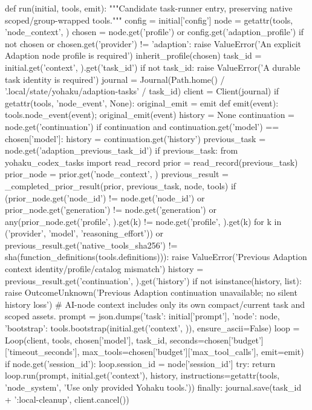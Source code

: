 {def run(initial, tools, emit):
    """Candidate task-runner entry, preserving native scoped/group-wrapped tools."""
    config = initial['config']
    node = getattr(tools, 'node_context', {})
    chosen = node.get('profile') or config.get('adaption_profile')
    if not chosen or chosen.get('provider') != 'adaption':
        raise ValueError('An explicit Adaption node profile is required')
    inherit_profile(chosen)
    task_id = initial.get('context', {}).get('task_id')
    if not task_id:
        raise ValueError('A durable task identity is required')
    journal = Journal(Path.home() / '.local/state/yohaku/adaption-tasks' / task_id)
    client = Client(journal)
    if getattr(tools, 'node_event', None):
        original_emit = emit
        def emit(event):
            tools.node_event(event); original_emit(event)
    history = None
    continuation = node.get('continuation')
    if continuation and continuation.get('model') == chosen['model']:
        history = continuation.get('history')
    previous_task = node.get('adaption_previous_task_id')
    if previous_task:
        from yohaku_codex_tasks import read_record
        prior = read_record(previous_task)
        prior_node = prior.get('node_context', {})
        previous_result = _completed_prior_result(prior, previous_task, node, tools)
        if (prior_node.get('node_id') != node.get('node_id') or
                prior_node.get('generation') != node.get('generation') or
                any(prior_node.get('profile', {}).get(k) != node.get('profile', {}).get(k)
                    for k in ('provider', 'model', 'reasoning_effort')) or
                previous_result.get('native_tools_sha256') != sha(function_definitions(tools.definitions))):
            raise ValueError('Previous Adaption context identity/profile/catalog mismatch')
        history = previous_result.get('continuation', {}).get('history')
        if not isinstance(history, list):
            raise OutcomeUnknown('Previous Adaption continuation unavailable; no silent history loss')
    # AI-node context includes only its own compact/current task and scoped assets.
    prompt = json.dumps({'task': initial['prompt'], 'node': node,
                         'bootstrap': tools.bootstrap(initial.get('context', {}))}, ensure_ascii=False)
    loop = Loop(client, tools, chosen['model'], task_id, seconds=chosen['budget']['timeout_seconds'],
                max_tools=chosen['budget']['max_tool_calls'], emit=emit)
    if node.get('session_id'):
        loop.session_id = node['session_id']
    try:
        return loop.run(prompt, initial.get('context'), history,
                        instructions=getattr(tools, 'node_system', 'Use only provided Yohaku tools.'))
    finally:
        journal.save(task_id + ':local-cleanup', client.cancel())


}
